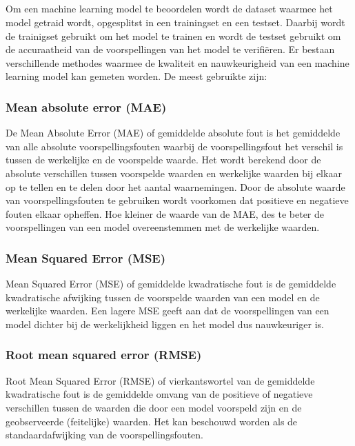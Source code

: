 \subsection{}%
\label{sec:Machine learning modellen evalueren}

Om een machine learning model te beoordelen wordt de dataset waarmee het model getraid wordt, opgesplitst in een trainingset en een testset. Daarbij wordt de trainigset gebruikt om het model te trainen en wordt de testset gebruikt om de accuraatheid van de voorspellingen van het model te verifiëren. Er bestaan verschillende methodes waarmee de kwaliteit en nauwkeurigheid van een machine learning model kan gemeten worden. De meest gebruikte zijn:

\subsubsection{Mean absolute error (MAE)}

De Mean Absolute Error (MAE) of gemiddelde absolute fout is het gemiddelde van alle absolute voorspellingsfouten waarbij de voorspellingsfout het verschil is tussen de werkelijke en de voorspelde waarde. Het wordt berekend door de absolute verschillen tussen voorspelde waarden en werkelijke waarden bij elkaar op te tellen en te delen door het aantal waarnemingen. Door de absolute waarde van voorspellingsfouten te gebruiken wordt voorkomen dat positieve en negatieve fouten elkaar opheffen. Hoe kleiner de waarde van de MAE, des te beter de voorspellingen van een model overeenstemmen met de werkelijke waarden.

\subsubsection{Mean Squared Error (MSE)}

Mean Squared Error (MSE) of gemiddelde kwadratische fout is de gemiddelde kwadratische afwijking tussen de voorspelde waarden van een model en de werkelijke waarden. Een lagere MSE geeft aan dat de voorspellingen van een model dichter bij de werkelijkheid liggen en het model dus nauwkeuriger is.

\subsubsection{Root mean squared error (RMSE)}

Root Mean Squared Error (RMSE) of vierkantswortel van de gemiddelde kwadratische fout is de gemiddelde omvang van de positieve of negatieve verschillen tussen de waarden die door een model voorspeld zijn en de geobserveerde (feitelijke) waarden. Het kan beschouwd worden als de standaardafwijking van de voorspellingsfouten. \\

